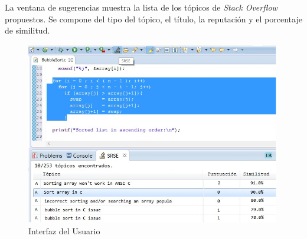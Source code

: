 La ventana de sugerencias muestra la lista de
los tópicos de \textit{Stack Overflow} propuestos.
Se compone del tipo del tópico, el título,
la reputación y el porcentaje de similitud.

\begin{figure}[h]
\centering
\includegraphics[width=30em]{img/srse.jpg}
\caption{Interfaz del Usuario}
\label{fig:srse}
\end{figure}






